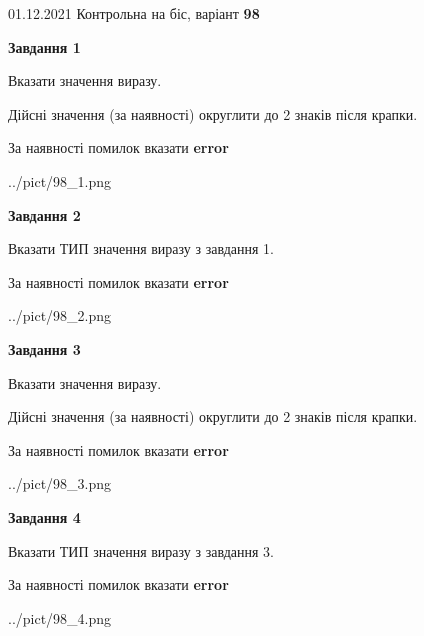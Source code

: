\documentclass[11pt, ukrainian]{article}
\begin{document}
{01.12.2021 Контрольна на біс, варіант  \No \textbf { 98 }\par}
{
\begin {large}
{\begin {center}\textbf{Завдання 1}\end {center}}\par
Вказати значення виразу. \par
Дійсні значення (за наявності) округлити до 2 знаків після крапки. \par
За наявності помилок вказати \textbf{error}

\begin{center}
	{../pict/98_1.png}
\end{center}
\newpage

{\begin {center}\textbf{Завдання 2}\end {center}}\par
Вказати ТИП значення виразу з завдання 1. \par
За наявності помилок вказати \textbf{error}

\begin{center}
	{../pict/98_2.png}
\end{center}
\newpage

{\begin {center}\textbf{Завдання 3}\end {center}}\par
Вказати значення виразу. \par
Дійсні значення (за наявності) округлити до 2 знаків після крапки. \par
За наявності помилок вказати \textbf{error}

\begin{center}
	{../pict/98_3.png}
\end{center}
\newpage

{\begin {center}\textbf{Завдання 4}\end {center}}\par
Вказати ТИП значення виразу з завдання 3. \par
За наявності помилок вказати \textbf{error}

\begin{center}
	{../pict/98_4.png}
\end{center}
\newpage


\end{large}}
\end{document}
